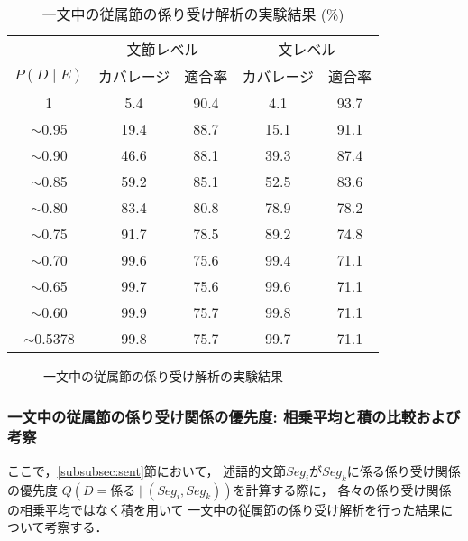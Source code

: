 \begin{table*}[t]
\begin{center}
\caption{一文中の従属節の係り受け解析の実験結果 (\%)}  
\label{tab:ressub-sent}
\begin{tabular}[c]{|c||c|c||c|c|} \hline
                        &    \multicolumn{2}{|c||}{文節レベル} 
                        &    \multicolumn{2}{|c|}{文レベル} \\ \cline{2-5}
$P(D\mid E)$ &  カバレージ & 適合率 & カバレージ & 適合率 \\ \hline\hline
1          &  5.4 & 90.4 & 4.1 & 93.7 \\
$\sim$0.95 & 19.4 & 88.7 & 15.1 & 91.1  \\
$\sim$0.90 & 46.6 & 88.1 & 39.3 & 87.4  \\
$\sim$0.85 & 59.2 & 85.1 & 52.5 & 83.6 \\
$\sim$0.80 &  83.4 & 80.8 & 78.9 & 78.2 \\
$\sim$0.75 &  91.7 & 78.5 & 89.2 & 74.8 \\
$\sim$0.70 &  99.6 & 75.6 & 99.4 & 71.1 \\
$\sim$0.65 &  99.7 & 75.6 & 99.6 & 71.1 \\
$\sim$0.60 &  99.9 & 75.7 &  99.8 & 71.1 \\
$\sim$0.5378 & 99.8 & 75.7 & 99.7 & 71.1 \\ \hline
\end{tabular}
\end{center}
\end{table*}

\begin{figure}[p]
  \begin{center}


        \caption{一文中の従属節の係り受け解析の実験結果}  
        \label{fig:ressub}
  \end{center}
\end{figure}

\subsubsection*{一文中の従属節の係り受け関係の優先度: 相乗平均と積の比較および考察}

ここで，\ref{subsubsec:sent}節において，
述語的文節$Seg_i$が$Seg_k$に係る係り受け関係の優先度
$Q(D\!=\!係る\mid (Seg_i,Seg_k))$を計算する際に，
各々の係り受け関係の相乗平均ではなく積を用いて
一文中の従属節の係り受け解析を行った結果について考察する．

